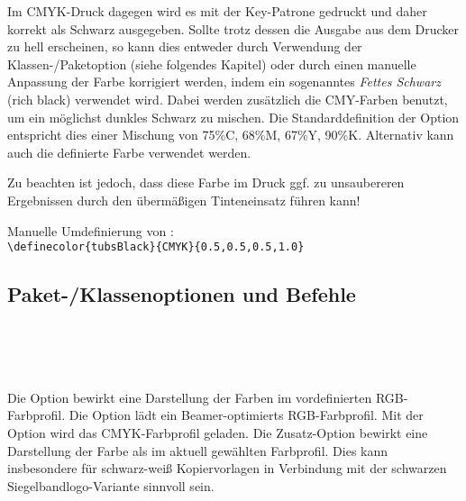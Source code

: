 Im CMYK-Druck dagegen wird es mit der Key-Patrone gedruckt und daher korrekt
als Schwarz ausgegeben.
Sollte trotz dessen die Ausgabe aus dem Drucker zu hell erscheinen,
so kann dies entweder durch Verwendung der Klassen-/Paketoption 
(siehe folgendes Kapitel) oder durch einen manuelle Anpassung der Farbe
 korrigiert werden, indem ein sogenanntes
\emph{Fettes Schwarz} (rich black) verwendet wird.
Dabei werden zusätzlich die CMY-Farben benutzt, um ein möglichst dunkles
Schwarz zu mischen. Die Standarddefinition der Option 
entspricht dies  einer Mischung von 75\%C, 68\%M, 67\%Y, 90\%K.
Alternativ kann auch die definierte Farbe  verwendet werden.

Zu beachten ist jedoch, dass diese Farbe im Druck ggf. zu unsaubereren
Ergebnissen durch den übermäßigen Tinteneinsatz führen kann!
  
\begin{example}
  Manuelle Umdefinierung von :\\
  \lstinline!\definecolor{tubsBlack}{CMYK}{0.5,0.5,0.5,1.0}!
\end{example}


\subsection{Paket-/Klassenoptionen und Befehle}

\begin{Declaration}
  \\
  \\
  \\[1ex]
\end{Declaration}

Die Option  bewirkt eine Darstellung der Farben im vordefinierten
RGB-Farbprofil.
Die Option  lädt ein Beamer-optimierts RGB-Farbprofil.
Mit der Option  wird das CMYK-Farbprofil geladen.
Die Zusatz-Option  bewirkt eine Darstellung der Farbe
 als  im aktuell gewählten Farbprofil.
Dies kann insbesondere für schwarz-weiß Kopiervorlagen in Verbindung
mit der schwarzen Siegelbandlogo-Variante sinnvoll sein.


\begin{Declaration}
\end{Declaration}

